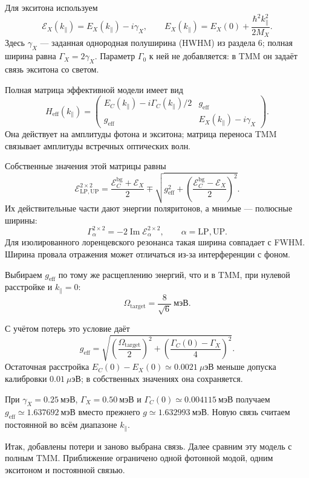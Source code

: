 \documentclass[12pt,a4paper]{article}
\begin{document}
Для экситона используем
\[
\mathcal E_X(k_\parallel)=E_X(k_\parallel)-i\gamma_X,
\qquad
E_X(k_\parallel)=E_X(0)+\frac{\hbar^2k_\parallel^2}{2M_X}.
\]
Здесь $\gamma_X$ --- заданная однородная полуширина (HWHM) из раздела 6; полная ширина равна $\Gamma_X=2\gamma_X$. Параметр $\Gamma_0$ к ней не добавляется: в TMM он задаёт связь экситона со светом.

Полная матрица эффективной модели имеет вид
\[
H_{\mathrm{eff}}(k_\parallel)=
\begin{pmatrix}
E_C(k_\parallel)-i\Gamma_C(k_\parallel)/2 & g_{\mathrm{eff}}\\
g_{\mathrm{eff}} & E_X(k_\parallel)-i\gamma_X
\end{pmatrix}.
\]
Она действует на амплитуды фотона и экситона; матрица переноса TMM связывает амплитуды встречных оптических волн.

Собственные значения этой матрицы равны
\[
\mathcal E_{\mathrm{LP,UP}}^{2\times2}
=\frac{\mathcal E_C^{\mathrm{bg}}+\mathcal E_X}{2}
\mp\sqrt{g_{\mathrm{eff}}^2+
\left(\frac{\mathcal E_C^{\mathrm{bg}}-\mathcal E_X}{2}\right)^2}.
\]
Их действительные части дают энергии поляритонов, а мнимые --- полюсные ширины:
\[
\Gamma_\alpha^{2\times2}
=-2\operatorname{Im}\mathcal E_\alpha^{2\times2},
\qquad \alpha=\mathrm{LP,UP}.
\]
Для изолированного лоренцевского резонанса такая ширина совпадает с FWHM. Ширина провала отражения может отличаться из-за интерференции с фоном.

\par\noindent\begin{minipage}{\textwidth}
Выбираем $g_{\mathrm{eff}}$ по тому же расщеплению энергий, что и в TMM, при нулевой расстройке и $k_\parallel=0$:
\[
\Omega_{\mathrm{target}}=\frac{8}{\sqrt{6}}\ \text{мэВ}.
\]
\end{minipage}\par
С учётом потерь это условие даёт
\[
g_{\mathrm{eff}}=
\sqrt{
\left(\frac{\Omega_{\mathrm{target}}}{2}\right)^2+
\left(\frac{\Gamma_C(0)-\Gamma_X}{4}\right)^2
}.
\]
Остаточная расстройка $E_C(0)-E_X(0)\simeq0.0021\ \mu\text{эВ}$ меньше допуска калибровки $0.01\ \mu\text{эВ}$; в собственных значениях она сохраняется.

При $\gamma_X=0.25\ \text{мэВ}$, $\Gamma_X=0.50\ \text{мэВ}$ и $\Gamma_C(0)\simeq0.004115\ \text{мэВ}$ получаем $g_{\mathrm{eff}}\simeq1.637692\ \text{мэВ}$ вместо прежнего $g\simeq1.632993\ \text{мэВ}$. Новую связь считаем постоянной во всём диапазоне $k_\parallel$.

Итак, добавлены потери и заново выбрана связь. Далее сравним эту модель с полным TMM. Приближение ограничено одной фотонной модой, одним экситоном и постоянной связью.
\end{document}
